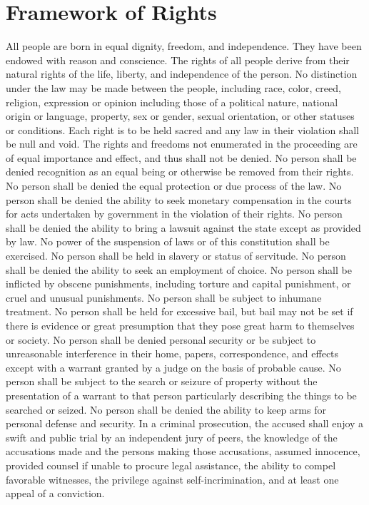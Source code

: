\documentclass{article}
\begin{document}
\section{Framework of Rights}
All people are born in equal dignity, freedom, and independence. They have been endowed with reason and conscience. The rights of all people derive from their natural rights of the life, liberty, and independence of the person. 
No distinction under the law may be made between the people, including race, color, creed, religion, expression or opinion including those of a political nature, national origin or language, property, sex or gender, sexual orientation, or other statuses or conditions.
Each right is to be held sacred and any law in their violation shall be null and void. The rights and freedoms not enumerated in the proceeding are of equal importance and effect, and thus shall not be denied.
No person shall be denied recognition as an equal being or otherwise be removed from their rights. No person shall be denied the equal protection or due process of the law.
No person shall be denied the ability to seek monetary compensation in the courts for acts undertaken by government in the violation of their rights. No person shall be denied the ability to bring a lawsuit against the state except as provided by law.
No power of the suspension of laws or of this constitution shall be exercised.
No person shall be held in slavery or status of servitude. No person shall be denied the ability to seek an employment of choice.
No person shall be inflicted by obscene punishments, including torture and capital punishment, or cruel and unusual punishments. No person shall be subject to inhumane treatment.
No person shall be held for excessive bail, but bail may not be set if there is evidence or great presumption that they pose great harm to themselves or society.
No person shall be denied personal security or be subject to unreasonable interference in their home, papers, correspondence, and effects except with a warrant granted by a judge on the basis of probable cause.
No person shall be subject to the search or seizure of property without the presentation of a warrant to that person particularly describing the things to be searched or seized.
No person shall be denied the ability to keep arms for personal defense and security.
In a criminal prosecution, the accused shall enjoy a swift and public trial by an independent jury of peers, the knowledge of the accusations made and the persons making those accusations, assumed innocence, provided counsel if unable to procure legal assistance, the ability to compel favorable witnesses, the privilege against self-incrimination, and at least one appeal of a conviction.
\end{document}
